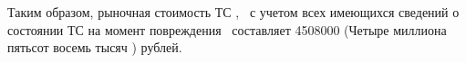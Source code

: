 %
%

\par Таким образом, рыночная стоимость ТС , \, с учетом всех имеющихся сведений о состоянии ТС на момент повреждения \,  составляет  4508000 (Четыре миллиона пятьсот восемь тысяч )  рублей.





